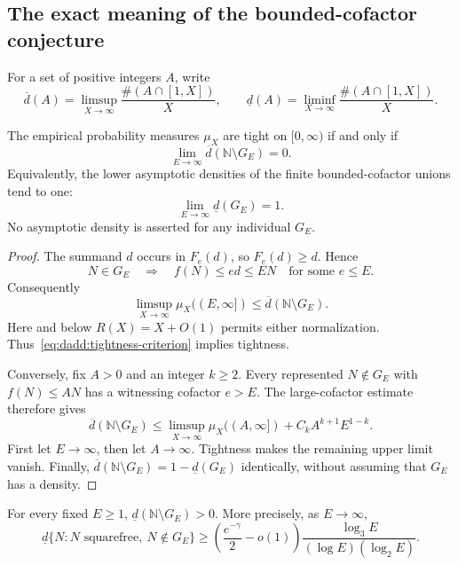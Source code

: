 \subsection{The exact meaning of the bounded-cofactor conjecture}

For a set of positive integers $A$, write
\[
 \overline d(A)=\limsup_{X\to\infty}
       \frac{\#(A\cap[1,X])}{X},
 \qquad
 \underline d(A)=\liminf_{X\to\infty}
       \frac{\#(A\cap[1,X])}{X}.
\]

\begin{proposition}
\label{prop:dadd:tightness}
The empirical probability measures $\mu_X$ are tight on
$[0,\infty)$ if and only if
\begin{equation}
\label{eq:dadd:tightness-criterion}
 \lim_{E\to\infty}
       \overline d(\mathbb N\setminus G_E)=0.
\end{equation}
Equivalently, the lower asymptotic densities of the finite
bounded-cofactor unions tend to one:
\[
 \lim_{E\to\infty}\underline d(G_E)=1.
\]
No asymptotic density is asserted for any individual $G_E$.
\end{proposition}

\begin{proof}
The summand $d$ occurs in $F_e(d)$, so $F_e(d)\geq d$. Hence
\[
 N\in G_E
 \quad\Longrightarrow\quad
 f(N)\leq e d\leq EN
 \quad\text{for some }e\leq E.
\]
Consequently
\begin{equation}
\label{eq:dadd:tightness-easy}
 \limsup_{X\to\infty}\mu_X((E,\infty])
 \leq\overline d(\mathbb N\setminus G_E).
\end{equation}
Here and below $R(X)=X+O(1)$ permits either normalization.
Thus~\eqref{eq:dadd:tightness-criterion} implies tightness.

Conversely, fix $A>0$ and an integer $k\geq2$. Every represented
$N\notin G_E$ with $f(N)\leq AN$ has a witnessing cofactor
$e>E$. The large-cofactor estimate therefore gives
\begin{equation}
\label{eq:dadd:tightness-reverse}
 \overline d(\mathbb N\setminus G_E)
 \leq\limsup_{X\to\infty}\mu_X((A,\infty])
      +C_kA^{k+1}E^{1-k}.
\end{equation}
First let $E\to\infty$, then let $A\to\infty$. Tightness makes
the remaining upper limit vanish. Finally,
$\overline d(\mathbb N\setminus G_E)=1-\underline d(G_E)$
identically, without assuming that $G_E$ has a density.
\end{proof}

\begin{corollary}
\label{cor:dadd:cofactor-defect}
For every fixed $E\geq1$,
$\underline d(\mathbb N\setminus G_E)>0$. More precisely,
as $E\to\infty$,
\begin{equation}
\label{eq:dadd:cofactor-defect}
 \underline d\{N:N\text{ squarefree},\ N\notin G_E\}
 \geq
 \left(\frac{e^{-\gamma}}2-o(1)\right)
 \frac{\log_3E}{(\log E)(\log_2E)}.
\end{equation}
\end{corollary}

